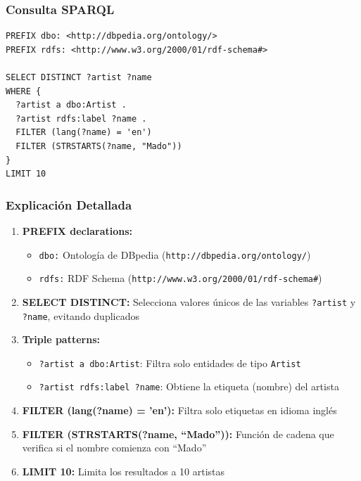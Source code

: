 \documentclass[12pt,a4paper]{article}
\begin{document}
\subsubsection{Consulta SPARQL}

\begin{lstlisting}[language=SPARQL, caption={Query 1: Artistas que empiezan con ``Mado''}]
PREFIX dbo: <http://dbpedia.org/ontology/>
PREFIX rdfs: <http://www.w3.org/2000/01/rdf-schema#>

SELECT DISTINCT ?artist ?name
WHERE {
  ?artist a dbo:Artist .
  ?artist rdfs:label ?name .
  FILTER (lang(?name) = 'en')
  FILTER (STRSTARTS(?name, "Mado"))
}
LIMIT 10
\end{lstlisting}

\subsubsection{Explicación Detallada}

\begin{enumerate}
    \item \textbf{PREFIX declarations:}
    \begin{itemize}
        \item \texttt{dbo:} Ontología de DBpedia (\texttt{http://dbpedia.org/ontology/})
        \item \texttt{rdfs:} RDF Schema (\texttt{http://www.w3.org/2000/01/rdf-schema\#})
    \end{itemize}
    
    \item \textbf{SELECT DISTINCT:} Selecciona valores únicos de las variables \texttt{?artist} y \texttt{?name}, evitando duplicados
    
    \item \textbf{Triple patterns:}
    \begin{itemize}
        \item \texttt{?artist a dbo:Artist}: Filtra solo entidades de tipo \texttt{Artist}
        \item \texttt{?artist rdfs:label ?name}: Obtiene la etiqueta (nombre) del artista
    \end{itemize}
    
    \item \textbf{FILTER (lang(?name) = 'en'):} Filtra solo etiquetas en idioma inglés
    
    \item \textbf{FILTER (STRSTARTS(?name, ``Mado'')):} Función de cadena que verifica si el nombre comienza con ``Mado''
    
    \item \textbf{LIMIT 10:} Limita los resultados a 10 artistas
\end{enumerate}
\end{document}
